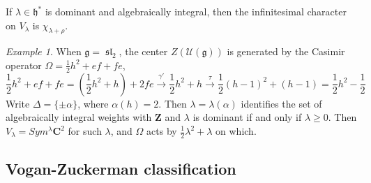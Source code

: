 \documentclass[leqno]{amsart}
\DeclareMathOperator{\sll}{\mathfrak{sl}}
\newcommand{\Z}{{\mathbf{Z}}}
\newcommand{\C}{\mathbf C}
\newcommand{\1}{\mathbf{1}}
\newcommand{\cfg}{\mathfrak{g}}
\newcommand{\cfh}{\mathfrak{h}}
\newcommand{\rt}{\Delta}
\theoremstyle{definition}
\theoremstyle{remark}
\newtheorem{example}[thm]{Example}
\begin{document}
If $\lambda\in\cfh^*$ is dominant and algebraically integral,
then the infinitesimal character on  $V_\lambda$
is  $\chi_{\lambda+\rho}$.

\begin{example}
	When $\cfg=\sll_2$,
	the center  $Z(\mathcal{U}(\cfg))$
	is generated by the Casimir operator
	$\Omega=\frac{1}{2}h^2+ef+fe$,
	\[
		\frac{1}{2}h^2+ef+fe=(\frac{1}{2}h^2+h)+2fe
		\xrightarrow{\gamma'} \frac{1}{2}h^2+h
		\xrightarrow{\tau} \frac{1}{2}(h-1)^2+(h-1)
		=\frac{1}{2}h^2-\frac{1}{2}
	\]
	Write $\rt=\{\pm\alpha\}$,
	where $\alpha(h)=2$.
	Then $\lambda=\lambda(\alpha)$ identifies
	the set of algebraically integral weights
	with $\Z$
	and $\lambda$ is dominant if and only if  $\lambda\geq 0$.
	Then $V_\lambda=Sym^\lambda\C^2$
	for such $\lambda$,
	and  $\Omega$ acts by  $\frac{1}{2}\lambda^2+\lambda$
	on which.
\end{example}

\subsection{Vogan-Zuckerman classification}
\end{document}
